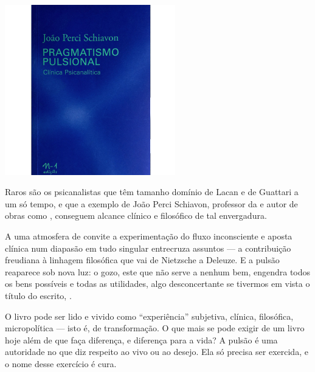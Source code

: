\begin{center}
\hspace*{.5cm}\includegraphics[width=74mm]{./grid/gozo.jpg}
\end{center}

\hspace*{-7cm}\hrulefill\hspace*{-7cm}

\medskip

\noindent{}Raros são os psicanalistas que têm tamanho domínio de Lacan e de Guattari a um só tempo, e que a exemplo de João Perci Schiavon, professor da  e autor de obras como {}, conseguem alcance clínico e filosófico de tal envergadura.  

A uma atmosfera de convite a experimentação do fluxo inconsciente e aposta clínica num diapasão em tudo singular entrecruza assuntos --- a contribuição freudiana à linhagem filosófica que vai de Nietzsche a Deleuze. E a pulsão reaparece sob nova luz: o gozo, este que não serve a nenhum bem, engendra todos os bens possíveis e todas as utilidades, algo desconcertante se tivermos em vista o título do escrito, {}.

O livro pode ser lido e vivido como “experiência” subjetiva, clínica, filosófica, micropolítica --- isto é, de transformação. O que mais se pode exigir de um livro hoje além de que faça diferença, e diferença para a vida? A pulsão é uma autoridade no que diz respeito ao vivo ou ao desejo. Ela só precisa ser exercida, e o nome desse exercício é cura.

\vfill

\hspace*{-.4cm}\begin{minipage}[c]{.8\linewidth}
\small{
{}}
\end{minipage}

